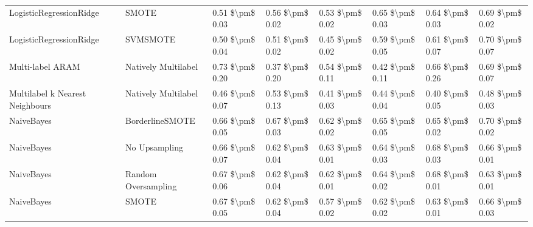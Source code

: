 \begin{tabular}{llllllll}
        LogisticRegressionRidge &                         SMOTE & 0.51 \$\textbackslash pm\$ 0.03 &           0.56 \$\textbackslash pm\$ 0.02 &       0.53 \$\textbackslash pm\$ 0.02 &        0.65 \$\textbackslash pm\$ 0.03 &                         0.64 \$\textbackslash pm\$ 0.03 & 0.69 \$\textbackslash pm\$ 0.02 \\
        LogisticRegressionRidge &                      SVMSMOTE & 0.50 \$\textbackslash pm\$ 0.04 &           0.51 \$\textbackslash pm\$ 0.02 &       0.45 \$\textbackslash pm\$ 0.02 &        0.59 \$\textbackslash pm\$ 0.05 &                         0.61 \$\textbackslash pm\$ 0.07 & 0.70 \$\textbackslash pm\$ 0.07 \\
               Multi-label ARAM &           Natively Multilabel & 0.73 \$\textbackslash pm\$ 0.20 &           0.37 \$\textbackslash pm\$ 0.20 &       0.54 \$\textbackslash pm\$ 0.11 &        0.42 \$\textbackslash pm\$ 0.11 &                         0.66 \$\textbackslash pm\$ 0.26 & 0.69 \$\textbackslash pm\$ 0.07 \\
Multilabel k Nearest Neighbours &           Natively Multilabel & 0.46 \$\textbackslash pm\$ 0.07 &           0.53 \$\textbackslash pm\$ 0.13 &       0.41 \$\textbackslash pm\$ 0.03 &        0.44 \$\textbackslash pm\$ 0.04 &                         0.40 \$\textbackslash pm\$ 0.05 & 0.48 \$\textbackslash pm\$ 0.03 \\
                     NaiveBayes &               BorderlineSMOTE & 0.66 \$\textbackslash pm\$ 0.05 &           0.67 \$\textbackslash pm\$ 0.03 &       0.62 \$\textbackslash pm\$ 0.02 &        0.65 \$\textbackslash pm\$ 0.05 &                         0.65 \$\textbackslash pm\$ 0.02 & 0.70 \$\textbackslash pm\$ 0.02 \\
                     NaiveBayes &                 No Upsampling & 0.66 \$\textbackslash pm\$ 0.07 &           0.62 \$\textbackslash pm\$ 0.04 &       0.63 \$\textbackslash pm\$ 0.01 &        0.64 \$\textbackslash pm\$ 0.03 &                         0.68 \$\textbackslash pm\$ 0.03 & 0.66 \$\textbackslash pm\$ 0.01 \\
                     NaiveBayes &           Random Oversampling & 0.67 \$\textbackslash pm\$ 0.06 &           0.62 \$\textbackslash pm\$ 0.04 &       0.62 \$\textbackslash pm\$ 0.01 &        0.64 \$\textbackslash pm\$ 0.02 &                         0.68 \$\textbackslash pm\$ 0.01 & 0.63 \$\textbackslash pm\$ 0.01 \\
                     NaiveBayes &                         SMOTE & 0.67 \$\textbackslash pm\$ 0.05 &           0.62 \$\textbackslash pm\$ 0.04 &       0.57 \$\textbackslash pm\$ 0.02 &        0.62 \$\textbackslash pm\$ 0.02 &                         0.63 \$\textbackslash pm\$ 0.01 & 0.66 \$\textbackslash pm\$ 0.03 \\

\end{tabular}
